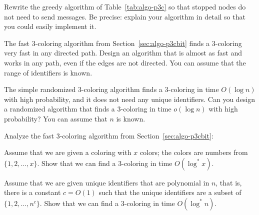 \begin{ex}\label{ex:intro-stopped}
    Rewrite the greedy algorithm of Table~\ref{tab:algo-p3c} so that stopped nodes do not need to send messages. Be precise: explain your algorithm in detail so that you could easily implement it.
\end{ex}

\begin{ex}\label{ex:intro-undir-path}
    The fast 3-coloring algorithm from Section~\ref{sec:algo-p3cbit} finds a $3$-coloring very fast in any directed path. Design an algorithm that is almost as fast and works in any path, even if the edges are not directed. You can assume that the range of identifiers is known.

\end{ex}

\begin{ex}
    The simple randomized 3-coloring algorithm finds a $3$-coloring in time $O(\log n)$ with high probability, and it does not need any unique identifiers. Can you design a randomized algorithm that finds a $3$-coloring in time $o(\log n)$ with high probability? You can assume that $n$ is known.

\end{ex}

\begin{ex}\label{ex:logstar}
    Analyze the fast 3-coloring algorithm from Section~\ref{sec:algo-p3cbit}:
    \begin{subex}
        \item Assume that we are given a coloring with $x$ colors; the colors are numbers from $\{1,2,\dotsc,x\}$. Show that we can find a $3$-coloring in time $O(\log^* x)$.
        \item Assume that we are given unique identifiers that are polynomial in $n$, that is, there is a constant $c = O(1)$ such that the unique identifiers are a subset of $\{1,2,\dotsc,n^c\}$. Show that we can find a $3$-coloring in time $O(\log^* n)$.
    \end{subex}
\end{ex}

